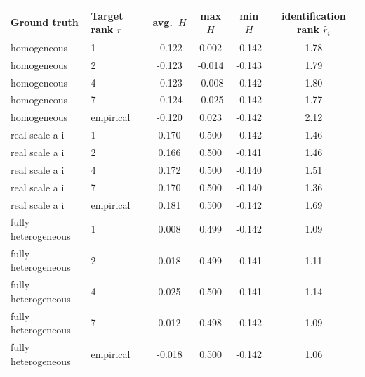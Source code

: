 \begin{tabular}{llcccc}
\toprule
Ground truth & Target rank $r$ & avg.\ $H$ & max $H$ & min $H$ & identification rank $\hat r_i$ \\
\midrule
homogeneous & 1 & -0.122 & 0.002 & -0.142 & 1.78 \\
homogeneous & 2 & -0.123 & -0.014 & -0.143 & 1.79 \\
homogeneous & 4 & -0.123 & -0.008 & -0.142 & 1.80 \\
homogeneous & 7 & -0.124 & -0.025 & -0.142 & 1.77 \\
homogeneous & empirical & -0.120 & 0.023 & -0.142 & 2.12 \\
real scale a i & 1 & 0.170 & 0.500 & -0.142 & 1.46 \\
real scale a i & 2 & 0.166 & 0.500 & -0.141 & 1.46 \\
real scale a i & 4 & 0.172 & 0.500 & -0.140 & 1.51 \\
real scale a i & 7 & 0.170 & 0.500 & -0.140 & 1.36 \\
real scale a i & empirical & 0.181 & 0.500 & -0.142 & 1.69 \\
fully heterogeneous & 1 & 0.008 & 0.499 & -0.142 & 1.09 \\
fully heterogeneous & 2 & 0.018 & 0.499 & -0.141 & 1.11 \\
fully heterogeneous & 4 & 0.025 & 0.500 & -0.141 & 1.14 \\
fully heterogeneous & 7 & 0.012 & 0.498 & -0.142 & 1.09 \\
fully heterogeneous & empirical & -0.018 & 0.500 & -0.142 & 1.06 \\
\bottomrule
\end{tabular}
